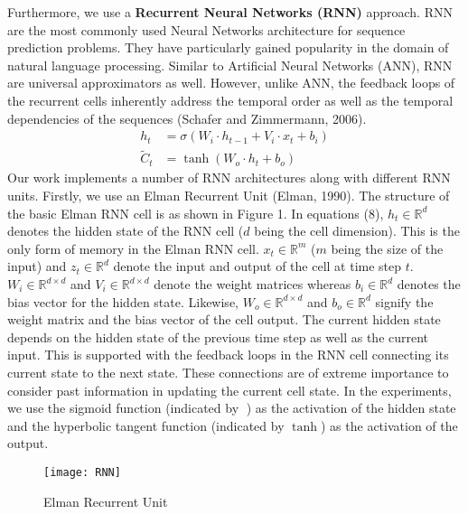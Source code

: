 \documentclass[12pt]{article}
\begin{document}
Furthermore, we use a \textbf{Recurrent Neural Networks (RNN)} approach. RNN are the most commonly used Neural Networks architecture for sequence prediction problems. They have particularly gained popularity in the domain of natural language processing. Similar to Artificial Neural Networks (ANN), RNN are universal approximators as well. However, unlike ANN, the feedback loops of the recurrent cells inherently address the temporal order as well as the temporal dependencies of the sequences (Schafer and Zimmermann, 2006).
\begin{equation}
\begin{split}
h_t&=\sigma (W_i\cdot h_{t-1} +V_i\cdot x_t+ b_i) \\[1ex]
\tilde{C}_t&=\tanh (W_o\cdot h_{t}+b_o)
\end{split}
\end{equation}
Our work implements a number of RNN architectures along with different RNN units. Firstly, we use an Elman Recurrent Unit (Elman, 1990). The structure of the basic Elman RNN cell is as shown in Figure 1. In equations (8), $h_t\in \mathbb{R}^{d}$ denotes the hidden state of the RNN cell ($d$ being the cell dimension). This is the only form of memory in the Elman RNN cell. $x_t\in \mathbb{R}^{m}$  ($m$ being the size of the input) and $z_t\in \mathbb{R}^{d}$ denote the input and output of the cell at time step $t$. $W_i \in \mathbb{R}^{d \times d}$ and $V_i \in \mathbb{R}^{d \times d}$ denote the weight matrices whereas $b_i\in \mathbb{R}^{d}$ denotes the bias vector for the hidden state. Likewise, $W_o\in \mathbb{R}^{d \times d}$ and $b_o\in \mathbb{R}^{d}$ signify the weight matrix and the bias vector of the cell output. The current hidden state depends on the hidden state of the previous time step as well as the current input. This is supported with the feedback loops in the RNN cell connecting its current state to the next state. These connections are of extreme importance to consider past information in updating the current cell state. In the experiments, we use the sigmoid function (indicated by ) as the activation of the hidden state and the hyperbolic tangent function (indicated by $\tanh$) as the activation of the output.

\begin{figure}[h]
\centering
\texttt{[image: RNN]}
\caption{Elman Recurrent Unit}
\end{figure}
\end{document}
